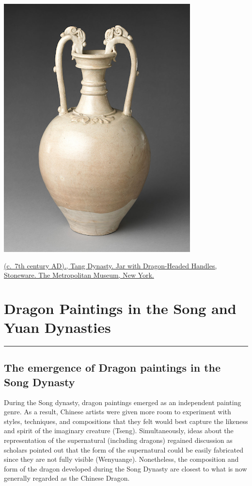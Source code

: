 \documentclass[
]{book}
\begin{document}
\includegraphics{images/jar.png}

\href{https://www.metmuseum.org/art/collection/search/45862}{(c.~7th century AD)., Tang Dynasty. Jar with Dragon-Headed Handles, Stoneware. The Metropolitan Museum, New York.}

\hypertarget{Dragon_Paintings}{%
\chapter*{Dragon Paintings in the Song and Yuan Dynasties}\label{Dragon_Paintings}}

\begin{center}\rule{0.5\linewidth}{0.5pt}\end{center}

\hypertarget{the-emergence-of-dragon-paintings-in-the-song-dynasty}{%
\section*{The emergence of Dragon paintings in the Song Dynasty}\label{the-emergence-of-dragon-paintings-in-the-song-dynasty}}

During the Song dynasty, dragon paintings emerged as an independent painting genre. As a result, Chinese artists were given more room to experiment with styles, techniques, and compositions that they felt would best capture the likeness and spirit of the imaginary creature (Tseng). Simultaneously, ideas about the representation of the supernatural (including dragons) regained discussion as scholars pointed out that the form of the supernatural could be easily fabricated since they are not fully visible (Wenyuange). Nonetheless, the composition and form of the dragon developed during the Song Dynasty are closest to what is now generally regarded as the Chinese Dragon.
\end{document}
